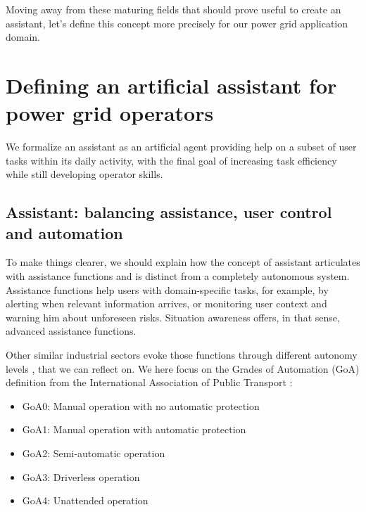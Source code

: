\documentclass{IOS-Book-Article}
\begin{document}
Moving away from these maturing fields that should prove useful to create an assistant, let's define this concept more precisely for our power grid application domain. 



\section{Defining an artificial assistant for power grid operators} \label{'defining-an-assistant'}
We formalize an assistant as an artificial agent providing help on a subset of user tasks within its daily activity, with the final goal of increasing task efficiency while still developing operator skills.


\subsection{Assistant: balancing assistance, user control and automation}
To make things clearer, we should explain how the concept of assistant articulates with assistance functions and is distinct from a completely autonomous system. Assistance functions help users with domain-specific tasks, for example, by alerting when relevant information arrives, or monitoring user context and warning him about unforeseen risks. Situation awareness \cite{panteli2015situation, prostejovsky2019future, naderpour2014intelligent} offers, in that sense, advanced assistance functions. 

Other similar industrial sectors evoke those functions through different autonomy levels \cite{barabas2017current, Brandenburger2019On, frohm2008levels}, that we can reflect on.
We here focus on the Grades of Automation (GoA) definition from the International Association of Public Transport \cite{cohen2015impacts, Brandenburger2019On}:
\begin{itemize}
	\item GoA0: Manual operation with no automatic protection
	\item GoA1: Manual operation with automatic protection
	\item GoA2: Semi-automatic operation
	\item GoA3: Driverless operation
	\item GoA4: Unattended operation
\end{itemize}
\end{document}
